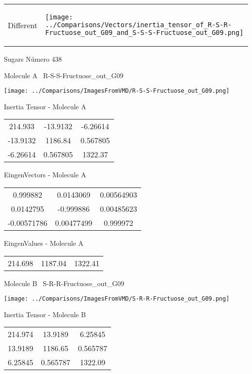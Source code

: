 \vtab[-5mm]
\begin{tabular}{*{2}{m{}}}
\begin{center}
\textcolor{NavyBlue}{\Large Different}
\end{center}
&
\begin{center}
\texttt{[image: ../Comparisons/Vectors/inertia\_tensor\_of\_R-S-R-Fructuose\_out\_G09\_and\_S-S-S-Fructuose\_out\_G09.png]}
\end{center}
\end{tabular}

 \newpage

\vtab[-3cm]
\begin{center}
{\large Sugars \tab Número 438}
\end{center}
\begin{multicols}{2}
\begin{center}

Molecule A \
R-S-S-Fructuose\_out\_G09

\texttt{[image: ../Comparisons/ImagesFromVMD/R-S-S-Fructuose\_out\_G09.png]}

Inertia Tensor - Molecule A \\
\begin{tabular}{|c c c|}
214.933	 & 	-13.9132	 & 	-6.26614	 \\
-13.9132	 & 	1186.84	 & 	0.567805	 \\
-6.26614	 & 	0.567805	 & 	1322.37
\end{tabular}

\vtab
 EingenVectors - Molecule A     \\
\begin{tabular}{|c c c|}
0.999882	 & 	0.0143069	 & 	0.00564903	 \\
0.0142795	 & 	-0.999886	 & 	0.00485623	 \\
-0.00571786	 & 	0.00477499	 & 	0.999972
\end{tabular}

\vtab
 EingenValues - Molecule A     \\
\begin{tabular}{|c c c|}
214.698	 & 	1187.04	 & 	1322.41	 \\
\end{tabular}
\columnbreak

Molecule B \
S-R-R-Fructuose\_out\_G09

\texttt{[image: ../Comparisons/ImagesFromVMD/S-R-R-Fructuose\_out\_G09.png]}

Inertia Tensor - Molecule B \\
\begin{tabular}{|c c c|}
214.974	 & 	13.9189	 & 	6.25845	 \\
13.9189	 & 	1186.65	 & 	0.565787	 \\
6.25845	 & 	0.565787	 & 	1322.09
\end{tabular}


\end{center}
\end{multicols}
